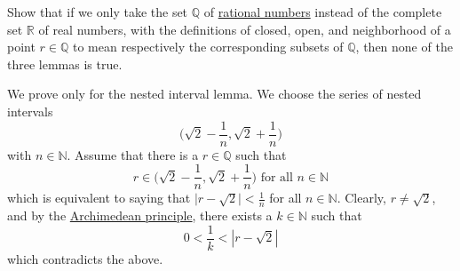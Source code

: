   \begin{exercise}[Zorich 2.3.3]
    Show that if we only take the set $\mathbb{Q}$ of \hyperref[alg-def:rational-numbers]{rational numbers} instead of the complete set $\mathbb{R}$ of real numbers, with the definitions of closed, open, and neighborhood of a point $r \in \mathbb{Q}$ to mean respectively the corresponding subsets of $\mathbb{Q}$, then none of the three lemmas is true. 
  \end{exercise}
  \begin{solution}
    We prove only for the nested interval lemma. We choose the series of nested intervals 
    \begin{equation}
      \bigg( \sqrt{2} - \frac{1}{n}, \sqrt{2} + \frac{1}{n} \bigg)
    \end{equation}
    with $n \in \mathbb{N}$. Assume that there is a $r \in \mathbb{Q}$ such that 
    \begin{equation}
      r \in \bigg( \sqrt{2} - \frac{1}{n}, \sqrt{2} + \frac{1}{n} \bigg) \text{ for all } n \in \mathbb{N}
    \end{equation}
    which is equivalent to saying that $\big| r - \sqrt{2}\big| < \frac{1}{n}$ for all $n \in \mathbb{N}$. Clearly, $r \neq \sqrt{2}$, and by the \hyperref[def:archimedean-principle]{Archimedean principle}, there exists a $k \in \mathbb{N}$ such that 
    \begin{equation}
      0 < \frac{1}{k} < |r - \sqrt{2}|
    \end{equation}
    which contradicts the above. 
  \end{solution}

